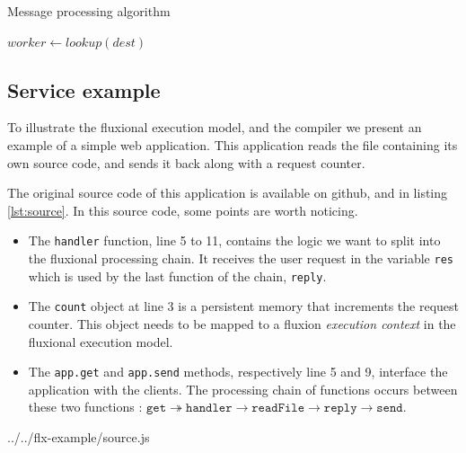 \begin{algorithm}
\caption{Message processing algorithm}
\label{alg:traitement}
\begin{algorithmic}
\State $worker \gets lookup(dest)$
\State {} 
\EndFor
\EndFunction
\end{algorithmic}
\end{algorithm}

\subsection{Service example}

To illustrate the fluxional execution model, and the compiler we present an example of a simple web application.
This application reads the file containing its own source code, and sends it back along with a request counter.

The original source code of this application is available on github\cite{flx-example}, and in listing \ref{lst:source}.
In this source code, some points are worth noticing.

\begin{itemize}
  \item The \texttt{handler} function, line 5 to 11, contains the logic we want to split into the fluxional processing chain.
  It receives the user request in the variable \texttt{res} which is used by the last function of the chain, \texttt{reply}.
  \item The \texttt{count} object at line 3 is a persistent memory that increments the request counter.
  This object needs to be mapped to a fluxion \textit{execution context} in the fluxional execution model.
  \item The \texttt{app.get} and \texttt{app.send} methods, respectively line 5 and 9, interface the application with the clients.
  The processing chain of functions occurs between these two functions : $\texttt{get} \twoheadrightarrow \texttt{handler} \to \texttt{readFile} \to \texttt{reply} \to \texttt{send}$.
\end{itemize}

{../../flx-example/source.js}

